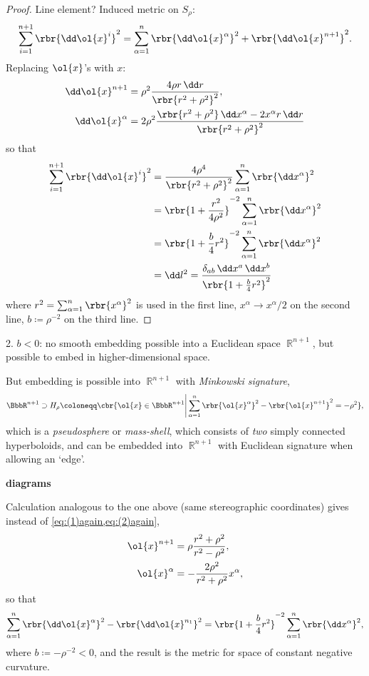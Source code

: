 \begin{proof}
Line element? Induced metric on $S_\rho$:
\begin{equation}
\sum_{i=1}^{n+1} \rbr{\dd \ol{x}^i}^2 = \sum_{\alpha = 1}^{n} \rbr{\dd 
\ol{x}^\alpha}^2 + \rbr{\dd \ol{x}^{n+1}}^2.
\end{equation}
Replacing $\ol{x}$'s with $x$:
\begin{align}
\dd \ol{x}^{n+1} &= \rho^2 \frac{4\rho r \,\dd r}{\rbr{r^2+\rho^2}^2},
\label{eq:(1)again}\\
\dd \ol{x}^\alpha &= 2\rho^2 \frac{\rbr{r^2+\rho^2}\,\dd x^\alpha - 2x^\alpha 
r \,\dd r}{\rbr{r^2+\rho^2}^2}
\label{eq:(2)again}
\end{align}
so that
\begin{align}
\sum_{i=1}^{n+1} \rbr{\dd \ol{x}^i}^2 &= 
\frac{4\rho^4}{\rbr{r^2+\rho^2}^2} \sum_{\alpha = 1}^{n} \rbr{\dd x^\alpha}^2
\nonumber \\
&= \rbr{1+\frac{r^2}{4\rho^2}}^{-2} \sum_{\alpha = 1}^{n} \rbr{\dd x^\alpha}^2
\nonumber \\
&= \rbr{1+\frac{b}{4}r^2}^{-2} \sum_{\alpha = 1}^{n} \rbr{\dd x^\alpha}^2
\nonumber \\
&= \dd l^2 = \frac{\delta_{ab}\,\dd x^a\,\dd x^b}{\rbr{1+\frac{b}{4}r^2}^2}
\end{align}
where $r^2 = \sum_{\alpha=1}^n\rbr{x^\alpha}^2$ is used in the first line,
$x^\alpha \to x^\alpha/2$ on the second line, $b \coloneqq \rho^{-2}$ on the 
third line.
\end{proof}

2. $b < 0$: no smooth embedding possible into a Euclidean space $\BbbR^{n+1}$, 
but possible to embed in higher-dimensional space.

But embedding is possible into $\BbbR^{n+1}$ with \emph{Minkowski signature},
\begin{equation}
\BbbR^{n+1} \supset H_\rho \coloneqq \cbr{\ol{x}\in\BbbR^{n+1} \Bigg| 
\sum_{\alpha=1}^n \rbr{\ol{x}^\alpha}^2 - \rbr{\ol{x}^{n+1}}^2 = -\rho^2},
\end{equation}
which is a \emph{pseudosphere} or \emph{mass-shell}, which consists of 
\emph{two} simply connected hyperboloids, and can be embedded into 
$\BbbR^{n+1}$ with Euclidean signature when allowing an `edge'.

\textbf{diagrams}

Calculation analogous to the one above (same stereographic coordinates) gives 
instead of \cref{eq:(1)again,eq:(2)again},
\begin{align}
\ol{x}^{n+1} &= \rho\frac{r^2+\rho^2}{r^2-\rho^2},\\
\ol{x}^{\alpha} &= -\frac{2\rho^2}{r^2+\rho^2}x^\alpha,
\end{align}
so that
\begin{equation}
\sum_{\alpha=1}^n\rbr{\dd \ol{x}^\alpha}^2 - \rbr{\dd \ol{x}^{n_1}}^2
= \rbr{1+\frac{b}{4}r^2}^{-2}\sum_{\alpha=1}^n\rbr{\dd x^\alpha}^2,
\end{equation}
where $b\coloneqq -\rho^{-2} < 0$, and the result is the metric for space of 
constant negative curvature.

